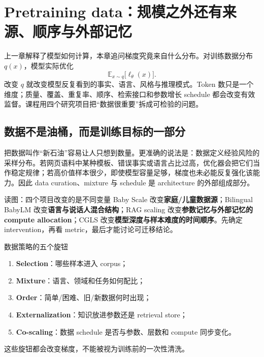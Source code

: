 \section{Pretraining data：规模之外还有来源、顺序与外部记忆}

上一章解释了模型如何计算，本章追问梯度究竟来自什么分布。对训练数据分布 $q(x)$，模型实际优化
\[
\mathbb{E}_{x\sim q}\big[\ell_{\theta}(x)\big].
\]
改变 $q$ 就改变模型反复看到的事实、语言、风格与推理模式。Token 数只是一个维度；质量、覆盖、重复率、顺序、检索接口和参数增长 schedule 都会改变有效监督。课程用四个研究项目把“数据很重要”拆成可检验的问题。

\subsection{数据不是油桶，而是训练目标的一部分}

把数据叫作“新石油”容易让人只想到数量。更准确的说法是：数据定义经验风险的采样分布。若网页语料中某种模板、错误事实或语言占比过高，优化器会把它们当作稳定规律；若高价值样本很少，即使模型容量足够，梯度也未必能反复强化该能力。因此 data curation、mixture 与 schedule 是 architecture 的外部组成部分。





\begin{knowledgebox}{读图：四个项目改变的是不同变量}
Baby Scale 改变\textbf{家庭/儿童数据源}；Bilingual BabyLM 改变\textbf{语言与说话人混合结构}；RAG scaling 改变\textbf{参数记忆与外部记忆的 compute allocation}；CGLS 改变\textbf{模型深度与样本难度的时间顺序}。先确定 intervention，再看 metric，最后才能讨论可迁移结论。
\end{knowledgebox}

\begin{importantbox}{数据策略的五个旋钮}
\begin{enumerate}
  \item \textbf{Selection}：哪些样本进入 corpus；
  \item \textbf{Mixture}：语言、领域和任务如何配比；
  \item \textbf{Order}：简单/困难、旧/新数据何时出现；
  \item \textbf{Externalization}：知识放进参数还是 retrieval store；
  \item \textbf{Co-scaling}：数据 schedule 是否与参数、层数和 compute 同步变化。
\end{enumerate}
这些旋钮都会改变梯度，不能被视为训练前的一次性清洗。
\end{importantbox}

